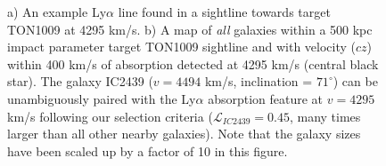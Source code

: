 \documentclass[12pt]{article}
\begin{document}
\begin{figure}[h!]
\begin{subfigure}[t]{0.5\textwidth}
        \caption{}
    \end{subfigure}
  \caption{\small{a) An example Ly$\alpha$ line found in a sightline towards target TON1009 at 4295 km/s. b) A map of \textit{all} galaxies within a 500 kpc impact parameter target TON1009 sightline and with velocity ($cz$) within 400 km/s of absorption detected at 4295 km/s (central black star). The galaxy IC2439 ($v=4494$ km/s, inclination = $71^{\circ}$) can be unambiguously paired with the Ly$\alpha$ absorption feature at $v=4295$ km/s following our selection criteria ($\mathcal{L}_{IC2439} = 0.45$, many times larger than all other nearby galaxies). Note that the galaxy sizes have been scaled up by a factor of 10 in this figure.}}
  \label{line}
\end{figure}
\end{document}
